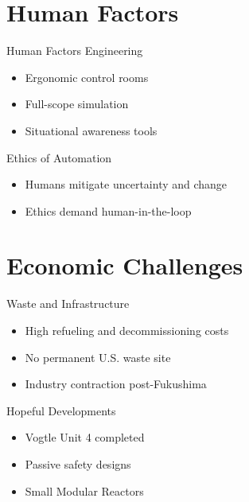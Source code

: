 \documentclass{beamer}
\begin{document}
\section{Human Factors}

\begin{frame}{Human Factors Engineering}
  \begin{itemize}
    \item Ergonomic control rooms
    \item Full-scope simulation
    \item Situational awareness tools
  \end{itemize}
\end{frame}

\begin{frame}{Ethics of Automation}
  \begin{itemize}
    \item Humans mitigate uncertainty and change
    \item Ethics demand human-in-the-loop
  \end{itemize}
\end{frame}

\section{Economic Challenges}

\begin{frame}{Waste and Infrastructure}
  \begin{itemize}
    \item High refueling and decommissioning costs
    \item No permanent U.S. waste site
    \item Industry contraction post-Fukushima
  \end{itemize}
\end{frame}

\begin{frame}{Hopeful Developments}
  \begin{itemize}
    \item Vogtle Unit 4 completed
    \item Passive safety designs
    \item Small Modular Reactors
  \end{itemize}
\end{frame}
\end{document}
